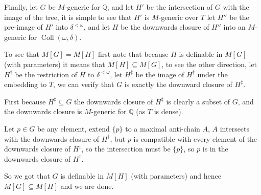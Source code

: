 \begin{cExercise}
	Finally, let $G$ be $M$-generic for $\mathbb Q$, and let $H'$ be the intersection of $G$ with the image of the tree, it is simple to see that $H'$ is $M$-generic over $T$ let $H''$ be the pre-image of $H'$ into $\delta^{<\omega}$, and let $H$ be the downwards closure of $H''$ into an $M$-generic for $\operatorname{Coll}(\omega,\delta)$.
	
	To see that $M[G]=M[H]$ first note that because $H$ is definable in $M[G]$ (with parameters) it means that $M[H]\subseteq M[G]$, to see the other direction, let $H^\dagger$ be the restriction of $H$ to $\delta^{<\omega}$, let $H^{\ddagger}$ be the image of $H^{\dagger}$ under the embedding to $T$, we can verify that $G$ is exactly the downward closure of $H^\ddagger$.
	
	First because $H^\ddagger\subseteq G$ the downwards closure of $H^\ddagger$ is clearly a subset of $G$, and the downwards closure is $M$-generic for $\mathbb Q$ (as $T$ is dense).
	
	Let $p\in G$ be any element, extend $\{p\}$ to a maximal anti-chain $A$, $A$ intersects with the downwards closure of $H^\ddagger$, but $p$ is compatible with every element of the downwards closure of $H^\ddagger$, so the intersection must be $\{p\}$, so $p$ is in the downwards closure of $H^\ddagger$.
	
	So we got that $G$ is definable in $M[H]$ (with parameters) and hence $M[G]\subseteq M[H]$ and we are done.
\end{cExercise}
